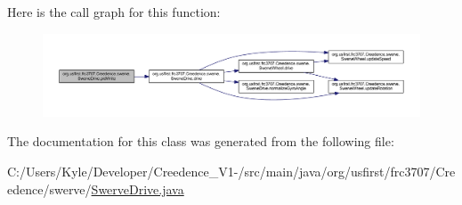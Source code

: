 Here is the call graph for this function\+:
\nopagebreak
\begin{figure}[H]
\begin{center}
\leavevmode
\includegraphics[width=350pt]{classorg_1_1usfirst_1_1frc3707_1_1_creedence_1_1swerve_1_1_swerve_drive_a887fecd8715cfa4d5576a3ea829bf6cb_cgraph}
\end{center}
\end{figure}


The documentation for this class was generated from the following file\+:\begin{DoxyCompactItemize}
\item 
C\+:/\+Users/\+Kyle/\+Developer/\+Creedence\+\_\+\+V1-\//src/main/java/org/usfirst/frc3707/\+Creedence/swerve/\mbox{\hyperlink{_swerve_drive_8java}{Swerve\+Drive.\+java}}\end{DoxyCompactItemize}
